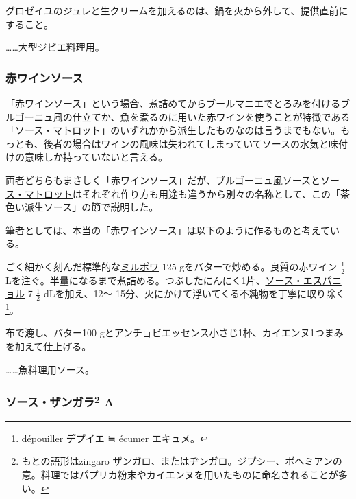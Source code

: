 \begin{recette}
グロゼイユのジュレと生クリームを加えるのは、鍋を火から外して、提供直前にすること。

\ldots{}\ldots{}大型ジビエ料理用。

\atoaki{}

\hypertarget{sauce-vin-rouge}{%
\subsubsection{赤ワインソース}\label{sauce-vin-rouge}}


 

「赤ワインソース」という場合、煮詰めてからブールマニエでとろみを付けるブルゴーニュ風の仕立てか、魚を煮るのに用いた赤ワインを使うことが特徴である「ソース・マトロット」のいずれかから派生したものなのは言うまでもない。もっとも、後者の場合はワインの風味は失われてしまっていてソースの水気と味付けの意味しか持っていないと言える。

両者どちらもまさしく「赤ワインソース」だが、\protect\hyperlink{sauce-bourguignonne}{ブルゴーニュ風ソース}と\protect\hyperlink{sauce-matelote}{ソース・マトロット}はそれぞれ作り方も用途も違うから別々の名称として、この「茶色い派生ソース」の節で説明した。

筆者としては、本当の「赤ワインソース」は以下のように作るものと考えている。

ごく細かく刻んだ標準的な\protect\hyperlink{mirepoix}{ミルポワ} 125
gをバターで炒める。良質の赤ワイン \(\frac{1}{2}\)
Lを注ぐ。半量になるまで煮詰める。つぶしたにんにく1片、\protect\hyperlink{sauce-espagnole}{ソース・エスパニョル}
7 \(\frac{1}{2}\) dLを加え、12〜
15分、火にかけて浮いてくる不純物を丁寧に取り除く\footnote{dépouiller
  デプイエ ≒ écumer エキュメ。}。

布で漉し、バター100
gとアンチョビエッセンス小さじ1杯、カイエンヌ1つまみを加えて仕上げる。

\ldots{}\ldots{}魚料理用ソース。

\atoaki{}

\hypertarget{sauce-zingara-a}{%
\subsubsection[ソース・ザンガラ
A]{\texorpdfstring{ソース・ザンガラ\footnote{もとの語形はzingaro
  ザンガロ、またはヂンガロ。ジプシー、ボヘミアンの意。料理ではパプリカ粉末やカイエンヌを用いたものに命名されることが多い。}
A}{ソース・ザンガラ A}}\label{sauce-zingara-a}}


\end{recette}
